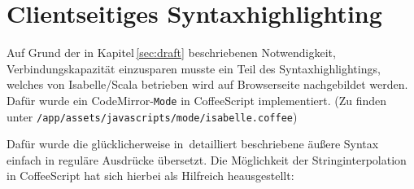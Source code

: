 \section{Clientseitiges Syntaxhighlighting}
\label{sec:syntax}

Auf Grund der in Kapitel\,\ref{sec:draft} beschriebenen Notwendigkeit, Verbindungskapazität
einzusparen musste ein Teil des Syntaxhighlightings, welches von Isabelle/Scala betrieben wird auf
Browserseite nachgebildet werden. Dafür wurde ein CodeMirror-\texttt{Mode} in CoffeeScript
implementiert. (Zu finden unter \texttt{/app/assets/javascripts/mode/isabelle.coffee})

Dafür wurde die glücklicherweise in\,\cite{isabelle} detailliert beschriebene äußere Syntax einfach
in reguläre Ausdrücke übersetzt. Die Möglichkeit der Stringinterpolation in CoffeeScript hat sich
hierbei als Hilfreich heausgestellt:

